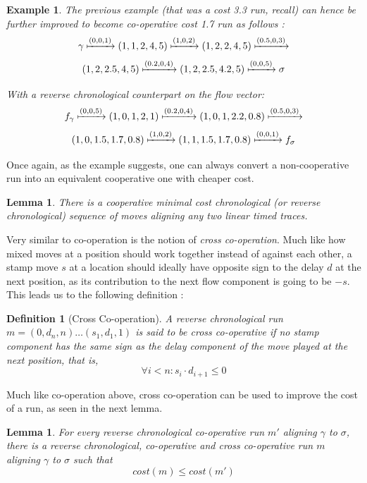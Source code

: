 \documentclass[conference]{IEEEtran}
\newtheorem{lemma}[theorem]{Lemma}
\newtheorem{definition}{Definition}
\newtheorem{example}{Example}
\begin{document}
	\begin{example}The previous example (that was a cost 3.3 run, recall) can hence be further improved to become co-operative cost 1.7 run as follows : 
		$$\gamma \xmapsto{(0, 0, 1)} (1, 1, 2, 4, 5) \xmapsto{(1, 0, 2)} (1, 2, 2, 4, 5) \xmapsto{(0.5, 0, 3)} $$
		$$(1, 2, 2.5, 4, 5) \xmapsto{(0.2, 0, 4)} (1, 2, 2.5, 4.2, 5) \xmapsto{(0, 0, 5)} \sigma $$
		
		With a reverse chronological counterpart on the flow vector: 
		$$f_\gamma \xmapsto{(0, 0, 5)} (1, 0, 1, 2, 1) \xmapsto{(0.2, 0, 4)} (1, 0, 1, 2.2, 0.8) \xmapsto{(0.5, 0, 3)} $$$$(1, 0, 1.5, 1.7, 0.8) \xmapsto{(1, 0, 2)} (1, 1, 1.5, 1.7, 0.8) \xmapsto{(0, 0, 1)} f_\sigma $$
		
	\end{example}
	
	Once again, as the example suggests, one can always convert a non-cooperative run into an equivalent cooperative one with cheaper cost. 
	
	\begin{lemma}\label{linescoop} There is a cooperative minimal cost chronological (or reverse chronological) sequence of moves aligning any two linear timed traces. 
	\end{lemma}
	
	Very similar to co-operation is the notion of \emph{cross co-operation}. Much like how mixed moves at a position should work together instead of against each other, a stamp move $s$ at a location should ideally have opposite sign to the delay $d$ at the next position, as its contribution to the next flow component is going to be $-s$. This leads us to the following definition : 
	
	\begin{definition}[Cross Co-operation]
		A reverse chronological run ${m = (0, d_n, n) \dots (s_1, d_1, 1)}$ is said to be cross co-operative if no stamp component has the same sign as the delay component of the move played at the next position, that is, $$\forall i < n : s_i \cdot d_{i+1} \leq 0$$
	\end{definition}
	
	Much like co-operation above, cross co-operation can be used to improve the cost of a run, as seen in the next lemma. 
	
	\begin{lemma}\label{crosscoop}
		For every reverse chronological co-operative run $m'$ aligning $\gamma$ to $\sigma$, there is a reverse chronological, co-operative and cross co-operative run $m$ aligning $\gamma$ to $\sigma$ such that $$cost(m) \leq cost(m')$$
	\end{lemma}
	
\end{document}
